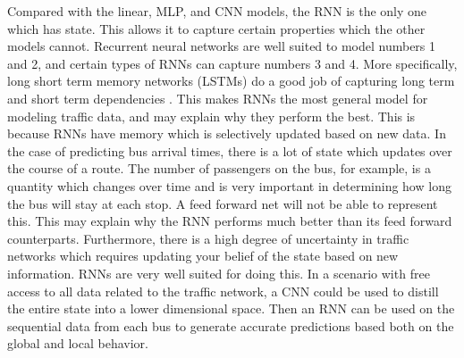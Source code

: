 Compared with the linear, MLP, and CNN models, the RNN is the only one which has state.
This allows it to capture certain properties which the other models cannot.
Recurrent neural networks are well suited to model numbers 1 and 2, and certain types of RNNs can capture numbers 3 and 4.
More specifically, long short term memory networks (LSTMs) do a good job of capturing long term and short term dependencies \cite{hochreiter1997long}.
This makes RNNs the most general model for modeling traffic data, and may explain why they perform the best.
This is because RNNs have memory which is selectively updated based on new data.
In the case of predicting bus arrival times, there is a lot of state which updates over the course of a route.
The number of passengers on the bus, for example, is a quantity which changes over time and is very important in determining how long the bus will stay at each stop.
A feed forward net will not be able to represent this.
This may explain why the RNN performs much better than its feed forward counterparts.
Furthermore, there is a high degree of uncertainty in traffic networks which requires updating your belief of the state based on new information.
RNNs are very well suited for doing this.
In a scenario with free access to all data related to the traffic network, a CNN could be used to distill the entire state into a lower dimensional space.
Then an RNN can be used on the sequential data from each bus to generate accurate predictions based both on the global and local behavior.
